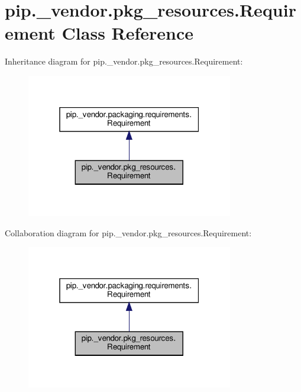 \hypertarget{classpip_1_1__vendor_1_1pkg__resources_1_1Requirement}{}\section{pip.\+\_\+vendor.\+pkg\+\_\+resources.\+Requirement Class Reference}
\label{classpip_1_1__vendor_1_1pkg__resources_1_1Requirement}


Inheritance diagram for pip.\+\_\+vendor.\+pkg\+\_\+resources.\+Requirement\+:
\nopagebreak
\begin{figure}[H]
\begin{center}
\leavevmode
\includegraphics[width=256pt]{classpip_1_1__vendor_1_1pkg__resources_1_1Requirement__inherit__graph}
\end{center}
\end{figure}


Collaboration diagram for pip.\+\_\+vendor.\+pkg\+\_\+resources.\+Requirement\+:
\nopagebreak
\begin{figure}[H]
\begin{center}
\leavevmode
\includegraphics[width=256pt]{classpip_1_1__vendor_1_1pkg__resources_1_1Requirement__coll__graph}
\end{center}
\end{figure}

